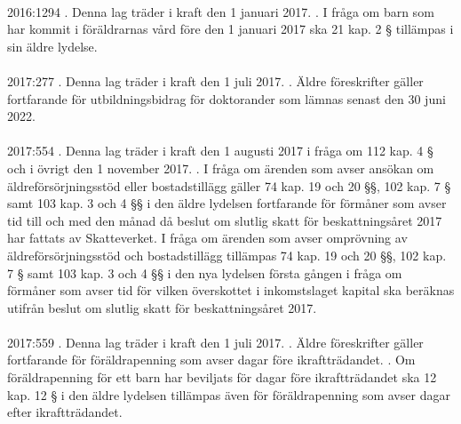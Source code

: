 \documentclass[a4paper,notitlepage,openany,10pt]{book}
\begin{document}
\paragraph*{}
2016:1294
. Denna lag träder i kraft den 1 januari 2017.
. I fråga om barn som har kommit i föräldrarnas vård före den 1 januari 2017 ska 21 kap. 2 § tillämpas i sin äldre lydelse.
\paragraph*{}
2017:277
. Denna lag träder i kraft den 1 juli 2017.
. Äldre föreskrifter gäller fortfarande för utbildningsbidrag för doktorander som lämnas senast den 30 juni 2022.
\paragraph*{}
2017:554
. Denna lag träder i kraft den 1 augusti 2017 i fråga om 112 kap. 4 § och i övrigt den 1 november 2017.
. I fråga om ärenden som avser ansökan om äldreförsörjningsstöd eller bostadstillägg gäller 74 kap. 19 och 20 §§, 102 kap. 7 § samt 103 kap. 3 och 4 §§ i den äldre lydelsen fortfarande för förmåner som avser tid till och med den månad då beslut om slutlig skatt för beskattningsåret 2017 har fattats av Skatteverket. I fråga om ärenden som avser omprövning av äldreförsörjningsstöd och bostadstillägg tillämpas 74 kap. 19 och 20 §§, 102 kap. 7 § samt 103 kap. 3 och 4 §§ i den nya lydelsen första gången i fråga om förmåner som avser tid för vilken överskottet i inkomstslaget kapital ska beräknas utifrån beslut om slutlig skatt för beskattningsåret 2017.
\paragraph*{}
2017:559
. Denna lag träder i kraft den 1 juli 2017.
. Äldre föreskrifter gäller fortfarande för föräldrapenning som avser dagar före ikraftträdandet.
. Om föräldrapenning för ett barn har beviljats för dagar före ikraftträdandet ska 12 kap. 12 § i den äldre lydelsen tillämpas även för föräldrapenning som avser dagar efter ikraftträdandet.
\end{document}
